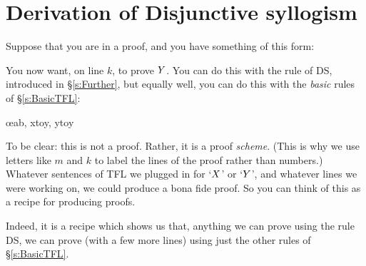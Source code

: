 \section{Derivation of Disjunctive syllogism}
Suppose that you are in a proof, and you have something of this form:
\begin{pf}
\end{pf}
You now want, on line $k$, to prove $Y$. You can do this with the rule of DS, introduced in \S\ref{s:Further}, but equally well, you can do this with the \emph{basic} rules of \S\ref{s:BasicTFL}:
	\begin{pf}
		\open
		\close
		\open
		\close
	\oe{ab, xtoy, ytoy}
\end{pf}

To be clear: this is not a proof. Rather, it is a proof \emph{scheme}. 
(This is why we use letters like $m$ and $k$ to label the lines of the proof rather than numbers.)
Whatever sentences of TFL we plugged in for `$X$' or `$Y$', and whatever lines we were working on, we could produce a bona fide proof. So you can think of this as a recipe for producing proofs. 

Indeed, it is a recipe which shows us that, anything we can prove using the rule DS, we can prove (with a few more lines) using just the other rules of \S\ref{s:BasicTFL}. 
%

